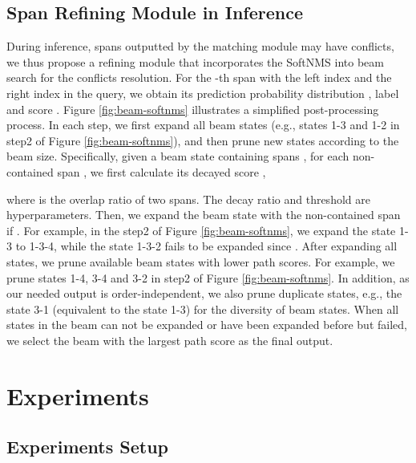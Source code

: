 \documentclass[11pt]{article}
\begin{document}
\subsection{Span Refining Module in Inference} 
\label{sec:span_refining_module}
During inference, spans outputted by the matching module may have conflicts, we thus propose a refining module that incorporates the SoftNMS into beam search for the conflicts resolution. 
For the -th span with the left index  and the right index  in the query, we obtain its prediction probability distribution , label  and score .
Figure \ref{fig:beam-softnms} illustrates a simplified post-processing process.
In each step, we first expand all beam states (e.g., states 1-3 and 1-2 in step2 of Figure \ref{fig:beam-softnms}), and then prune new states according to the beam size.
Specifically, given a beam state  containing spans ,
for each non-contained span , we first calculate its decayed score ,

where  is the overlap ratio of two spans. The decay ratio  and threshold  are hyperparameters.
Then, we expand the beam state  with the non-contained span  if .
For example,  in the step2 of Figure \ref{fig:beam-softnms}, we expand the state 1-3 to 1-3-4, while the state 1-3-2 fails to be expanded since .
After expanding all states,
we prune available beam states with lower path scores.
For example, we prune states 1-4, 3-4 and 3-2 in step2 of Figure \ref{fig:beam-softnms}.
In addition, as our needed output is order-independent,
we also prune duplicate states, e.g., the state 3-1 (equivalent to the state 1-3) for the diversity of beam states.
When all states in the beam can not be expanded or have been expanded before but failed,
we select the beam with the largest path score as the final output. 
\section{Experiments}
\subsection{Experiments Setup}
\end{document}
